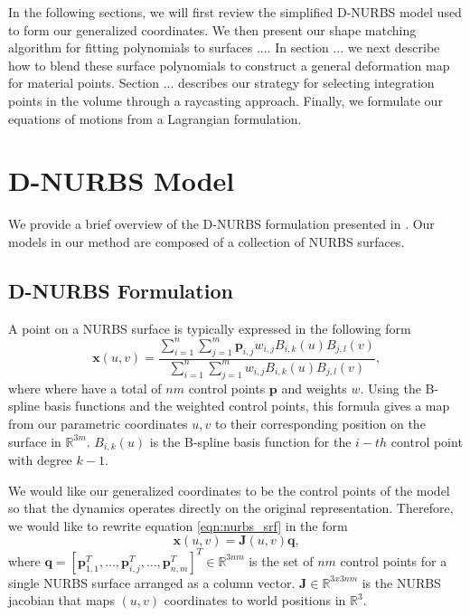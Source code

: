 In the following sections, we will first review the simplified D-NURBS model used to form our generalized coordinates. We then present our shape matching algorithm for fitting polynomials to surfaces .... In section ... we next describe how to blend these surface polynomials to construct a general deformation map for material points. Section ... describes our strategy for selecting integration points in the volume through a raycasting approach. Finally, we formulate our equations of motions from a Lagrangian formulation.

\section{D-NURBS Model}
We provide a brief overview of the D-NURBS formulation presented in \cite{10.1145/176579.176580}. Our models in our method are composed of a collection of NURBS surfaces. 

\subsection{D-NURBS Formulation}
A point on a NURBS surface is typically expressed in the following form
\begin{equation}
\label{eqn:nurbs_srf}
    \mathbf{x}(u,v) = \frac{\sum_{i=1}^{n}\sum_{j=1}^{m}  \mathbf{p}_{i,j} w_{i,j} B_{i,k}(u)B_{j,l}(v)}
    {\sum_{i=1}^{n}\sum_{j=1}^{m} w_{i,j} B_{i,k}(u)B_{j,l}(v)}
    \text{,}
\end{equation}
where where have a total of $nm$ control points $\mathbf{p}$ and weights $w$. Using the B-spline basis functions and the weighted control points, this formula gives a map from our parametric coordinates $u,v$ to their corresponding position on the surface in $\mathbb{R}^{3m}$. $B_{i,k}(u)$ is the B-spline basis function for the $i-th$ control point with degree $k-1$.

We would like our generalized coordinates to be the control points of the model so that the dynamics operates directly on the original representation. Therefore, we would like to rewrite equation \ref{eqn:nurbs_srf} in the form
\begin{equation}
    \mathbf{x}(u,v) = \mathbf{J}(u,v)\mathbf{q}
    \text{,}
\end{equation}
where $\mathbf{q} = \left[ \mathbf{p}_{1,1}^T, \dots, \mathbf{p}_{i,j}^T, \dots, \mathbf{p}_{n,m}^T \right]^T \in \mathbb{R}^{3nm}$ is the set of $nm$ control points  for a single NURBS surface arranged as a column vector. $\mathbf{J} \in  \mathbb{R}^{3 x 3nm}$ is the NURBS jacobian that maps $(u,v)$ coordinates to world positions in $\mathbb{R}^{3}$.

